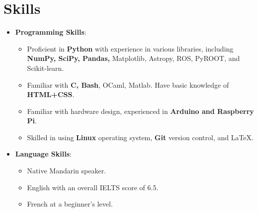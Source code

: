 \documentclass[letterpaper,11pt]{article}
\newcommand{\resumeItem}[2]{
  \item\small{
    \textbf{#1}{: #2 \vspace{-2pt}}
  }
}
\newcommand{\resumeItemListStart}{\begin{itemize}}
\newcommand{\resumeItemListEnd}{\end{itemize}\vspace{-5pt}}
\begin{document}
%
\section{Skills}
 \resumeItemListStart
\resumeItem{Programming Skills}{}
    \begin{itemize}
        \item Proficient in \textbf{Python} with experience in various libraries, including \textbf{NumPy, SciPy, Pandas,} Matplotlib, Astropy, ROS, PyROOT, and Scikit-learn.
        \item Familiar with \textbf{C, Bash}, OCaml, Matlab. Have basic knowledge of \textbf{HTML+CSS}.
        \item Familiar with hardware design, experienced in \textbf{Arduino and Raspberry Pi}.
        \item Skilled in using \textbf{Linux} operating system, \textbf{Git} version control, and \LaTeX.
    \end{itemize}
\resumeItem {Language Skills}{}
    \begin{itemize}
        \item Native Mandarin speaker.
        \item English with an overall IELTS score of 6.5.
        \item French at a beginner's level.
    \end{itemize}
\resumeItemListEnd
 


%
%

\end{document}
